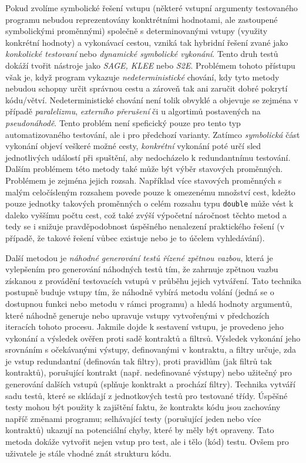 \documentclass[czech, ma, kiv, he, iso690alph, pdf, viewonly]{fasthesis}
\begin{document}
        Pokud zvolíme symbolické řešení vstupu (některé vstupní argumenty testovaného programu nebudou reprezentovány konktrétními hodnotami, ale zastoupené symbolickými proměnnými) společně s determinovanými vstupy (využity konkrétní hodnoty) a vykonávací cestou, vzniká tak hybridní řešení zvané jako \emph{konkolické testovaní} nebo \emph{dynamické symbolické vykonání}. Tento druh testů dokáží tvořit nástroje jako \textit{SAGE, KLEE} nebo \textit{S2E}. Problémem tohoto přístupu však je, když program vykazuje \emph{nedeterministické} chování, kdy tyto metody nebudou schopny určit správnou cestu a zároveň tak ani zaručit dobré pokrytí kódu/větví. Nedeterministické chování není tolik obvyklé a objevuje se zejména v případě \textit{paralelizmu}, \textit{externího přerušení} či u algortimů postavených na \textit{pseudonáhodě}. \cite{ncatlab_nondeterministic_computation} Tento problém není speficický pouze pro tento typ automatizovaného testování, ale i pro předchozí varianty. Zatímco \emph{symbolická} část vykonání objeví veškeré možné cesty, \emph{konkrétní} vykonání poté určí sled jednotlivých událostí při spuštění, aby nedocházelo k redundantnímu testování. \cite{aldrich2019concolic} Dalším problémem této metody také může být výběr stavových proměnných. Problémem je zejména jejich rozsah. Například více stavových proměnných s malým celočísleným rozsahem povede pouze k omezenému množství cest, kdežto pouze jednotky takových proměnných o celém rozsahu typu \verb|double| může vést k daleko vyššímu počtu cest, což také zvýší výpočetní náročnost těchto metod a tedy se i snižuje pravděpodobnost úspěšného nenalezení praktického řešení (v případě, že takové řešení vůbec existuje nebo je to účelem vyhledávání). \cite{concolic_chalenges_2019} \cite{engler2006exe} \cite{sen2005cute} \cite{zhou2006safedrive}

        Další metodou je \textit{náhodné generování testů řízené zpětnou vazbou}, která je vylepšením pro generování náhodných testů tím, že zahrnuje zpětnou vazbu získanou z provádění testovacích vstupů v průběhu jejich vytváření. Tato technika postupně buduje vstupy tím, že náhodně vybírá metodu volání (jedná se o dostupnou funkci nebo metodu v rámci programu) a hledá hodnoty argumentů, které náhodně generuje nebo upravuje vstupy vytvořenými v předchozích iteracích tohoto procesu. Jakmile dojde k sestavení vstupu, je provedeno jeho vykonání a výsledek ověřen proti sadě \gls{kontrakt}ů a \glspl{filtr}ů. Výsledek vykonání jeho srovnáním s očekávanými výstupy, definovanými v kontraktu, a filtry určuje, zda je vstup redundantní (definován tak filtry), proti pravidlům (jak filtrů tak kontraktů), porušující \gls{kontrakt} (např. nedefinované výstupy) nebo užitečný pro generování dalších vstupů (splňuje konktrakt a prochází filtry). Technika vytváří sadu testů, které se skládají z jednotkových testů pro testované třídy. Úspěšné testy mohou být použity k zajištění faktu, že \glspl{kontrakt} kódu jsou zachovány napříč změnami programu; selhávající testy (porušující jeden nebo více kontraktů) ukazují na potenciální chyby, které by měly být opraveny. Tato metoda dokáže vytvořit nejen vstup pro test, ale i tělo (kód) testu. Ovšem pro uživatele je stále vhodné znát strukturu kódu. \cite{FeedbackDirectedRT}
\end{document}
